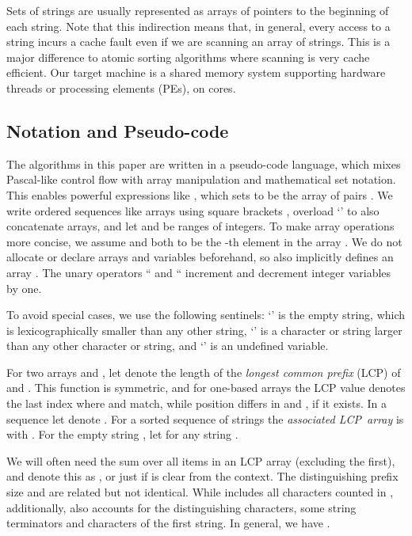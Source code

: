 \documentclass[a4paper]{myjournal}
\begin{document}
Sets of strings are usually represented as arrays of pointers to the beginning
of each string. Note that this indirection means that, in general, every access
to a string incurs a cache fault even if we are scanning an array of strings.
This is a major difference to atomic sorting algorithms where scanning is very
cache efficient.  Our target machine is a shared memory system supporting 
hardware threads or processing elements (PEs), on  cores.

\subsection{Notation and Pseudo-code}

The algorithms in this paper are written in a pseudo-code language, which mixes
Pascal-like control flow with array manipulation and mathematical set notation.
This enables powerful expressions like , which sets  to be the array of pairs . We write ordered sequences like arrays using square brackets
, overload `' to also concatenate arrays, and let  and  be ranges of integers.  To
make array operations more concise, we assume  and  both to be the
-th element in the array . We do not allocate or declare arrays and
variables beforehand, so  also implicitly defines an array . The
unary operators `` and `` increment and decrement integer variables
by one.

To avoid special cases, we use the following sentinels: `' is the
empty string, which is lexicographically smaller than any other string,
`' is a character or string larger than any other character or string,
and `' is an undefined variable.

For two arrays  and , let  denote the length of the
\emph{longest common prefix} (LCP) of  and . This function is symmetric,
and for one-based arrays the LCP value denotes the last index where  and 
match, while position  differs in  and , if it exists.  In a
sequence  let  denote . For a sorted sequence
of strings  the \emph{associated LCP~array}
 is  with . For the empty string , let  for any string .

We will often need the sum over all items in an LCP array  (excluding the
first), and denote this as , or just  if  is
clear from the context. The distinguishing prefix size  and  are related
but not identical. While  includes all characters counted in ,
additionally,  also accounts for the distinguishing characters, some string
terminators and characters of the first string. In general, we have .
\end{document}
